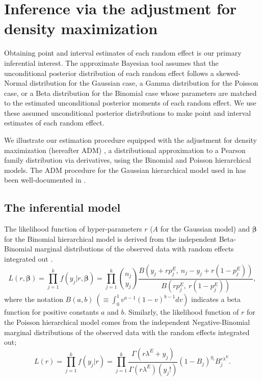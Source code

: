 \documentclass[article]{jss}
\begin{document}
\section[Estimation]{Inference via the adjustment for density maximization}\label{sec3}

Obtaining point and interval estimates of each random effect is our primary inferential interest.  The approximate Bayesian tool assumes that the unconditional posterior distribution of each random effect follows a skewed-Normal distribution for the Gaussian case,  a Gamma distribution for the Poisson case, or a Beta distribution for the Binomial case whose parameters are matched to the estimated unconditional posterior moments of each random effect. We use these assumed unconditional posterior distributions to make point and interval estimates of each random effect. 

We illustrate our estimation procedure equipped with the adjustment for density maximization (hereafter ADM) \citep{carl1988, morris1997, tang2011}, a distributional approximation to a Pearson family distribution via derivatives, using the Binomial and Poisson hierarchical models. The ADM procedure for the Gaussian hierarchical model used in   has been well-documented in \cite{kelly2014advances}.

\subsection[Inference]{The inferential model}\label{inference}


The likelihood function of hyper-parameters $r$ ($A$ for the Gaussian model) and $\boldsymbol{\beta}$ for the Binomial hierarchical model is derived from the independent Beta-Binomial marginal distributions of the observed data with random effects integrated out \citep{skellam1948}. %
\begin{equation}\label{marginal_binomial}
L(r, \boldsymbol{\boldsymbol{\beta}})=\prod_{j=1}^k f(y_j\vert r, \boldsymbol{\boldsymbol{\beta}})=\prod_{j=1}^k\binom{n_j}{y_j}\frac{B(y_j+rp^E_j, ~n_j-y_j+r(1-p^E_j))}{B(rp^E_j, ~r(1-p^E_j))},
\end{equation}
where the notation $B(a, b)~(\equiv\int_0^1 v^{a-1}(1-v)^{b-1}dv)$ indicates a beta function for positive constants $a$ and $b$. Similarly, the likelihood function of $r$ for the Poisson hierarchical model comes from the independent Negative-Binomial marginal distributions of the observed data with the random effects integrated out;
\begin{equation}\label{marginal_poisson}
L(r)=\prod_{j=1}^k f(y_j\vert r)=\prod^{k}_{j=1} \frac{\Gamma(r \lambda^E+y_j)}{\Gamma(r\lambda^E)(y_j!)}(1-B_{j})^{y_{i}}B_{j}^{r \lambda^E}.
\end{equation}
\end{document}
